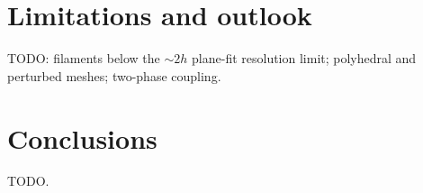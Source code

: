 \documentclass[preprint,3p,11pt]{elsarticle}
\begin{document}
\section{Limitations and outlook}
\label{sec:outlook}
TODO: filaments below the $\sim 2h$ plane-fit resolution limit; polyhedral
and perturbed meshes; two-phase coupling.

\section{Conclusions}
\label{sec:conclusions}
TODO.



\end{document}
